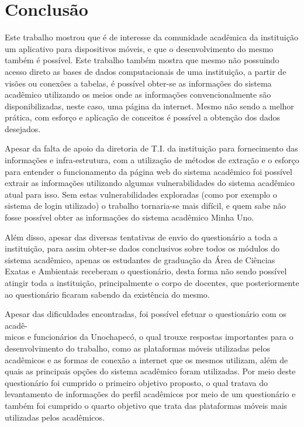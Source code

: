 \chapter{Conclusão}

Este trabalho mostrou que é de interesse da comunidade acadêmica da instituição um aplicativo para dispositivos móveis, e que o desenvolvimento do mesmo também é possível. Este trabalho também mostra que mesmo não possuindo acesso direto as bases de dados computacionais de uma instituição, a partir de visões ou conexões a tabelas, é possível obter-se as informações do sistema acadêmico utilizando os meios onde as informações convencionalmente são disponibilizadas, neste caso, uma página da internet. Mesmo não sendo a melhor prática, com esforço e aplicação de conceitos é possível a obtenção dos dados desejados.

Apesar da falta de apoio da diretoria de T.I. da instituição para fornecimento das informações e infra-estrutura, com a utilização de métodos de extração e o esforço para entender o funcionamento da página web do sistema acadêmico foi possível extrair as informações utilizando algumas vulnerabilidades do sistema acadêmico atual para isso. Sem estas vulnerabilidades exploradas (como por exemplo o sistema de login utilizado) o trabalho tornaria-se mais difícil, e quem sabe não fosse possível obter as informações do sistema acadêmico Minha Uno.

Além disso, apesar das diversas tentativas de envio do questionário a toda a instituição, para assim obter-se dados conclusivos sobre todos os módulos do sistema acadêmico, apenas os estudantes de graduação da Área de Ciências Exatas e Ambientais receberam o questionário, desta forma não sendo possível atingir toda a instituição, principalmente o corpo de docentes, que posteriormente ao questionário ficaram sabendo da existência do mesmo.

Apesar das dificuldades encontradas, foi possível efetuar o questionário com os acadê- \\ micos e funcionários da Unochapecó, o qual trouxe respostas importantes para o desenvolvimento do trabalho, como as plataformas móveis utilizadas pelos acadêmicos e as formas de conexão a internet que os mesmos utilizam, além de quais as principais opções do sistema acadêmico foram utilizadas. Por meio deste questionário foi cumprido o primeiro objetivo proposto, o qual tratava do levantamento de informações do perfil acadêmicos por meio de um questionário e também foi cumprido o quarto objetivo que trata das plataformas móveis mais utilizadas pelos acadêmicos.

